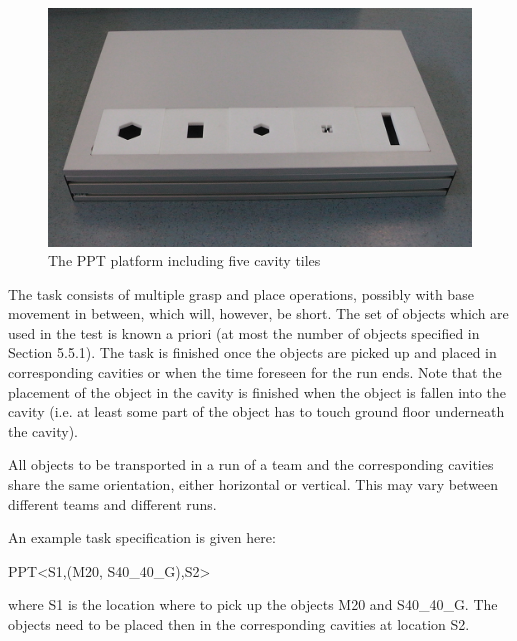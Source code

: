 \begin{figure}
\includegraphics[width= \textwidth ]{../images/ppt_plattform.jpg}
\caption{The PPT platform including five cavity tiles}
\label{fig:ppt_plattform}
\end{figure}

The task consists of multiple grasp and place operations, possibly with base movement in between, which will, however, be short. The set of objects which are used in the test is known a priori (at most the number of objects specified in Section 5.5.1). The task is finished once the objects are picked up and placed in corresponding cavities or when the time foreseen for the run ends. Note that the placement of the object in the cavity is finished when the object is fallen into the cavity (i.e. at least some part of the object has to touch ground floor underneath the cavity).
\par
All objects to be transported in a run of a team and the corresponding cavities share the same orientation, either horizontal or vertical. This may vary between different teams and different runs.
\par
An example task specification is given here:
\par
PPT\textless S1,(M20, S40\_40\_G),S2\textgreater
\par
where S1 is the location where to pick up the objects M20 and S40\_40\_G. The objects need to be placed then in the corresponding cavities at location S2.
%
%
%

